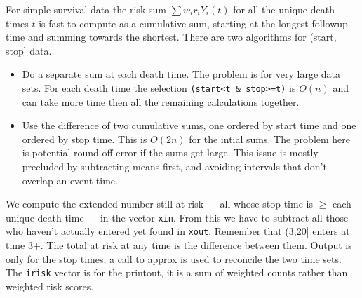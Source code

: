\documentclass{article}
\newcommand{\code}[1]{\texttt{#1}}
\begin{document}
For simple survival data the risk sum $\sum w_i r_i Y_i(t)$ for all 
the unique death times $t$ is fast to compute as a cumulative sum, starting
at the longest followup time and summing towards the shortest.
There are two algorithms for (start, stop] data. 
\begin{itemize}
  \item Do a separate sum at each death time.  The problem is for very large
    data sets.  For each death time the selection \code{(start<t \& stop>=t)}
    is $O(n)$ and can take more time then all the remaining calculations 
    together.
  \item Use the difference of two cumulative sums, one ordered by start time
    and one ordered by stop time. This is $O(2n)$ for the intial sums.  The
    problem here is potential round off error if the sums get large.
    This issue is mostly precluded by subtracting means first, and avoiding
    intervals that don't overlap an event time.
\end{itemize}
We compute the extended number still at risk --- all whose stop time
is $\ge$ each unique death time --- in the vector \code{xin}.  From
this we have to subtract all those who haven't actually entered yet       %
found in \code{xout}.  Remember that (3,20] enters at time 3+.
The total at risk at any time is the difference between them.  
Output is only for the
stop times; a call to approx is used to reconcile the two time sets.
The \code{irisk} vector is for the printout, it is a sum of weighted counts
rather than weighted risk scores.
\end{document}
